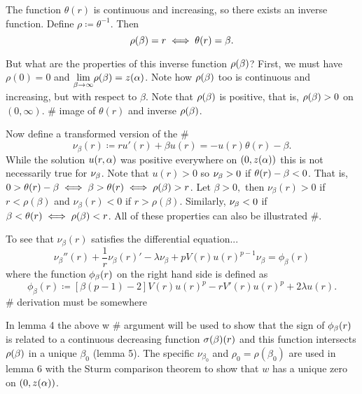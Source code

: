 The function $\theta(r)$ is continuous and increasing, so there exists an inverse function. Define $\rho\coloneqq\theta^{-1}$. Then $$\rho(\beta)=r\iff\theta(r)=\beta.$$ 

But what are the properties of this inverse function $\rho(\beta)$? First, we must have $\rho(0)=0$ and $\underset{\beta\to\infty}{\lim}\rho(\beta)=z(\alpha)$. Note how $\rho(\beta)$ too is continuous and increasing, but with respect to $\beta$. Note that $\rho(\beta)$ is positive, that is, $\rho(\beta)>0$ on $(0,\infty)$. \# image of $\theta(r)$ and inverse $\rho(\beta)$. 

Now define a transformed version of the \# $$\nu_{\beta}(r)\coloneqq ru'(r)+\beta u(r)=-u(r){\theta(r)-\beta}.$$ 
While the solution $u(r,\alpha)$ was positive everywhere on $(0,z(\alpha))$ this is not necessarily true for $\nu_{\beta}$. 
Note that $u(r)>0$ so $\nu_{\beta}>0$ if $\theta(r)-\beta<0$. 
That is, $0>\theta(r)-\beta\iff\beta>\theta(r)\iff\rho(\beta)>r$. 
Let $\beta>0,$ then $\nu_{\beta}(r)>0$ if $r<\rho(\beta)$ and $\nu_{\beta}(r)<0$ if $r>\rho(\beta)$. 
Similarly, $\nu_{\beta}<0$ if $\beta<\theta(r)\iff\rho(\beta)<r$. 
All of these properties can also be illustrated \#. 

To see that $\nu_{\beta}(r)$ satisfies the differential equation... 
$$\nu_{\beta}''(r)+\frac{1}{r}\nu_{\beta}(r)'-\lambda\nu_{\beta}+pV(r)u(r)^{p-1}\nu_{\beta}=\phi_{\beta}(r)$$
where the function $\phi_{\beta}(r)$ on the right hand side is defined as $$\phi_{\beta}(r)\coloneqq\left[\beta(p-1)-2\right]V(r)u(r)^p-rV'(r)u(r)^p+2\lambda u(r).$$
\# derivation must be somewhere

In lemma 4 the above w \# argument will be used to show that the sign of $\phi_{\beta}(r)$ is related to a continuous decreasing function $\sigma(\beta)(r)$ and this function intersects $\rho(\beta)$ in a unique $\beta_0$ (lemma 5). The specific $\nu_{\beta_0}$ and $\rho_0=\rho(\beta_0)$ are used in lemma 6 with the Sturm comparison theorem to show that $w$ has a unique zero on $(0,z(\alpha))$.


